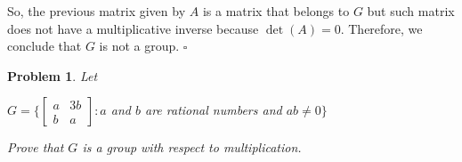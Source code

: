 \documentclass[a4paper,openany,11pt]{book}
\newtheorem{Prob}{Problem}
\begin{document}
So, the previous matrix given by $A$ is a matrix that belongs to $G$ but such matrix does not have a multiplicative inverse because $\det(A) = 0$. Therefore, we conclude that $G$ is not a group. \hspace{0.1cm} $\square$

\begin{Prob}
	Let
	
	\begin{center}
		$G = \biggl\{\left[\begin{array}{cc}
		a & 3b\\
		b & a
		\end{array}\right] : a$ and $b$ are rational numbers and $ab \neq 0\biggr\} $
	\end{center}
	
	Prove that $G$ is a group with respect to multiplication.
\end{Prob}
\end{document}
